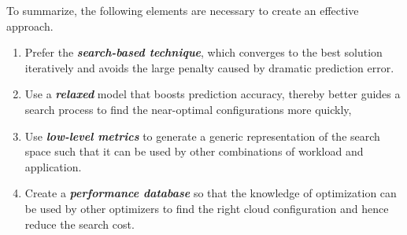 To summarize, the following elements are necessary
to create an effective approach.
\begin{enumerate}[leftmargin=*]
    \setlength\itemsep{-0.4em}
    \item Prefer the \textbf{\textit{search-based technique}}, which converges to the best solution iteratively and avoids the large penalty caused by dramatic prediction error.
    \item Use a \textbf{\textit{relaxed}} model that boosts prediction accuracy, thereby better guides a search process to find the near-optimal configurations more quickly,
    \item Use \textbf{\textit{low-level metrics}} to generate a generic representation of the search space such that it can be used by other combinations of workload and application.
    \item Create a \textbf{\textit{performance database}} so that the knowledge of optimization can be used by other optimizers to find the right cloud configuration and hence reduce the search cost. 
\end{enumerate}